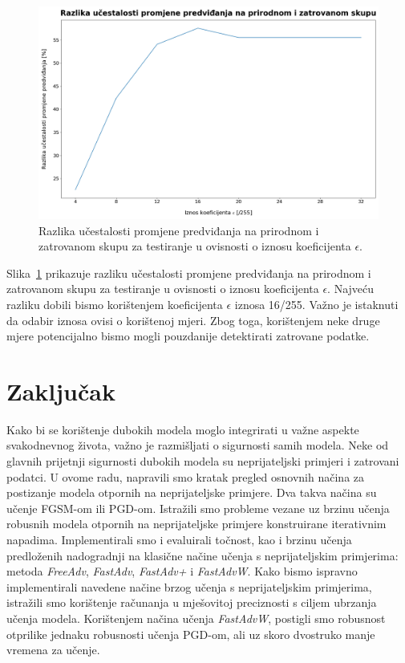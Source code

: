 \documentclass[times, utf8, zavrsni, numeric]{fer}
\begin{document}
\pagebreak

\begin{figure}[htb]
    \centering
    \includegraphics[scale=0.355]{../poisoned_stats/change_of_predictions_difference_double.png}
    \caption{Razlika učestalosti promjene predviđanja na prirodnom i zatrovanom skupu za testiranje u ovisnosti o iznosu koeficijenta $\epsilon$.}
    \label{fig:change_of_predictions_difference}
\end{figure}

Slika~\ref{fig:change_of_predictions_difference} prikazuje razliku učestalosti promjene predviđanja na prirodnom i zatrovanom skupu za testiranje u ovisnosti o iznosu koeficijenta $\epsilon$.
Najveću razliku dobili bismo korištenjem koeficijenta $\epsilon$ iznosa 16/255. Važno je istaknuti da odabir iznosa ovisi o korištenoj mjeri. Zbog toga, korištenjem neke druge mjere potencijalno bismo mogli pouzdanije detektirati zatrovane podatke.

\chapter{Zaključak}

Kako bi se korištenje dubokih modela moglo integrirati u važne aspekte svakodnevnog života, važno je razmišljati o sigurnosti samih modela. 
Neke od glavnih prijetnji sigurnosti dubokih modela su neprijateljski primjeri i zatrovani podatci.
U ovome radu, napravili smo kratak pregled osnovnih načina za postizanje modela otpornih na neprijateljske primjere. Dva takva načina su učenje FGSM-om ili PGD-om.
Istražili smo probleme vezane uz brzinu učenja robusnih modela otpornih na neprijateljske primjere konstruirane iterativnim napadima.
Implementirali smo i evaluirali točnost, kao i brzinu učenja predloženih nadogradnji na klasične načine učenja s neprijateljskim primjerima: metoda \textit{FreeAdv}, \textit{FastAdv}, \textit{FastAdv+} i \textit{FastAdvW}.
Kako bismo ispravno implementirali navedene načine brzog učenja s neprijateljskim primjerima, istražili smo korištenje računanja u mješovitoj preciznosti s ciljem ubrzanja učenja modela.
Korištenjem načina učenja \textit{FastAdvW}, postigli smo robusnost otprilike jednaku robusnosti učenja PGD-om, ali uz skoro dvostruko manje vremena za učenje.
\end{document}
